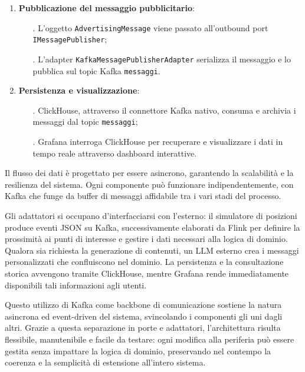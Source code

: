 \documentclass[10pt]{article}
\begin{document}
\begin{enumerate}
        \item \textbf{Pubblicazione del messaggio pubblicitario}:
        \begin{itemize}
            \item[.] L'oggetto \texttt{AdvertisingMessage} viene passato all'outbound port \texttt{IMessagePublisher};
            \item[.] L'adapter \texttt{KafkaMessagePublisherAdapter} serializza il messaggio e lo pubblica sul topic Kafka \texttt{messaggi}.
        \end{itemize}

        \item \textbf{Persistenza e visualizzazione}:
        \begin{itemize}
            \item[.] ClickHouse, attraverso il connettore Kafka nativo, consuma e archivia i messaggi dal topic \texttt{messaggi};
            \item[.] Grafana interroga ClickHouse per recuperare e visualizzare i dati in tempo reale attraverso dashboard interattive.
        \end{itemize}
    \end{enumerate}

    Il flusso dei dati è progettato per essere asincrono, garantendo la scalabilità e la resilienza del sistema. Ogni componente può funzionare indipendentemente, con Kafka che funge da buffer di messaggi affidabile tra i vari stadi del processo.

    Gli adattatori si occupano d'interfacciarsi con l'esterno: il simulatore di posizioni produce eventi JSON su Kafka, successivamente elaborati da Flink per definire la prossimità ai punti di interesse e gestire i dati necessari alla logica di dominio. Qualora sia richiesta la generazione di contenuti, un LLM esterno crea i messaggi personalizzati che confluiscono nel dominio. La persistenza e la consultazione storica avvengono tramite ClickHouse, mentre Grafana rende immediatamente disponibili tali informazioni agli utenti.

    Questo utilizzo di Kafka come backbone di comunicazione sostiene la natura asincrona ed event-driven del sistema, svincolando i componenti gli uni dagli altri. Grazie a questa separazione in porte e adattatori, l'architettura risulta flessibile, manutenibile e facile da testare: ogni modifica alla periferia può essere gestita senza impattare la logica di dominio, preservando nel contempo la coerenza e la semplicità di estensione all'intero sistema.
\end{document}
